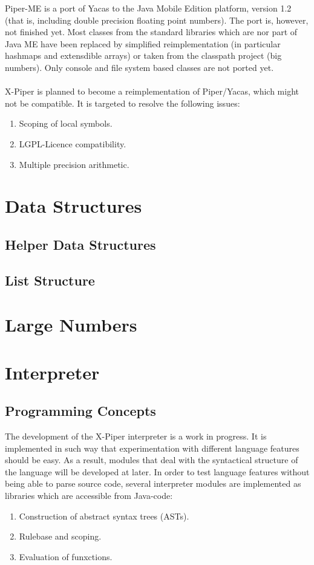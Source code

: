 Piper-ME is a port of Yacas to the Java Mobile Edition platform, version 1.2 
(that is, including double precision floating point numbers). The port is, however,
not finished yet. Most classes from the standard libraries which are nor part of
Java ME have been replaced by simplified reimplementation (in particular hashmaps
and extensdible arrays) or taken from the classpath project (big numbers). Only
console and file system based classes are not ported yet.\\
\\
X-Piper is planned to become a reimplementation of Piper/Yacas, which might
not be compatible. It is targeted to resolve the following issues:
\begin{enumerate}
\item Scoping of local symbols.
\item LGPL-Licence compatibility.
\item Multiple precision arithmetic.
\end{enumerate}


\chapter{Data Structures}

\section{Helper Data Structures}


\section{List Structure}



\chapter{Large Numbers}


\chapter{Interpreter}

\section{Programming Concepts}

The development of the X-Piper interpreter is a work in progress. It is implemented
in such way that experimentation with different language features should be easy.
As a result, modules that deal with the syntactical structure of the language will
be developed at later. In order to test language features without being able to
parse source code, several interpreter modules are implemented as libraries which
are accessible from Java-code:
\begin{enumerate}
\item Construction of abstract syntax trees (ASTs).
\item Rulebase and scoping.
\item Evaluation of funxctions.
\end{enumerate}

